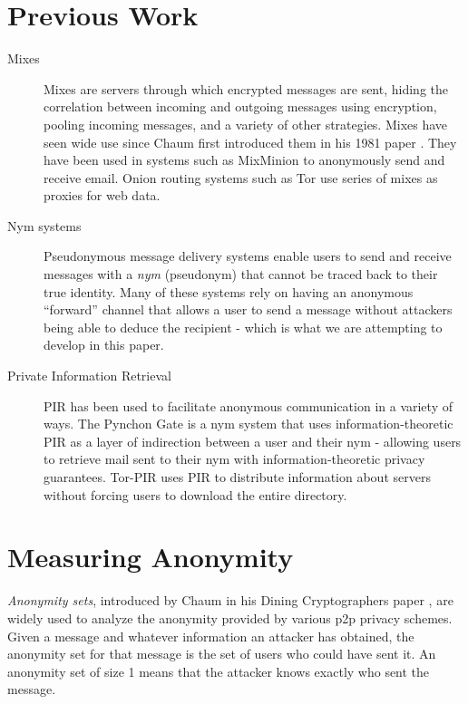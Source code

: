 \documentclass[twocolumn]{paper}
\begin{document}
\section{Previous Work}
\begin{description}
\item[Mixes] Mixes are servers through which encrypted messages are sent, hiding the correlation between incoming and outgoing messages using encryption, pooling incoming messages, and a variety of other strategies. Mixes have seen wide use since Chaum first introduced them in his 1981 paper \cite{chaum-mix}. They have been used in systems such as MixMinion\cite{minion-design} to anonymously send and receive email. Onion routing systems such as Tor \cite{tor-design} use series of mixes as proxies for web data. 

\item[Nym systems] Pseudonymous message delivery systems enable users to send and receive messages with a \textit{nym} (pseudonym) that cannot be traced back to their true identity. Many of these systems rely on having an anonymous ``forward'' channel that allows a user to send a message without attackers being able to deduce the recipient - which is what we are attempting to develop in this paper. 

\item[Private Information Retrieval] PIR has been used to facilitate anonymous communication in a variety of ways. The Pynchon Gate \cite{wpes2005} is a nym system that uses information-theoretic PIR as a layer of indirection between a user and their nym - allowing users to retrieve mail sent to their nym with information-theoretic privacy guarantees. Tor-PIR \cite{TODO} uses PIR to distribute information about servers without forcing users to download the entire directory. 

\end{description}

\section{Measuring Anonymity}
  \textit{Anonymity sets}, introduced by Chaum in his Dining Cryptographers paper \cite{chaum-dc}, are widely used to analyze the anonymity provided by various p2p privacy schemes. Given a message and whatever information an attacker has obtained, the anonymity set for that message is the set of users who could have sent it. An anonymity set of size 1 means that the attacker knows exactly who sent the message.
\end{document}
